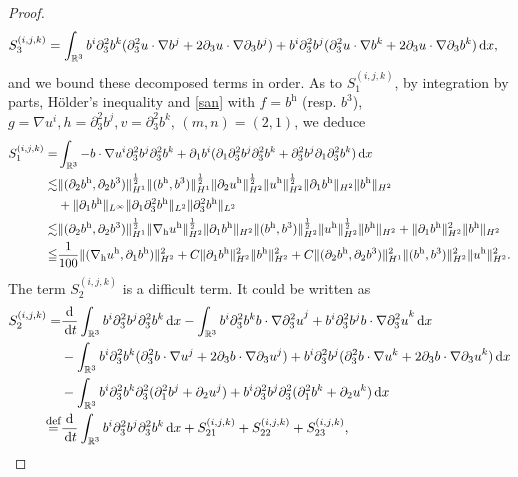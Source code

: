 \documentclass[11pt]{amsart}
\theoremstyle{definition}
\newcommand{\R}{\mathbb{R}}
\newcommand{\h}{\mathrm{h}}
\def\eqdefa{\buildrel\hbox{\footnotesize def}\over =}
\newcommand{\dx}{\,{\rm d}x}
\newcommand{\dt}{\,{\rm d}t}
\newcommand{\nablah}{\nabla_{\mathrm{h}}}
\numberwithin{equation}{section}
\begin{document}
\begin{proof}
\begin{align*}
		S^{(i,j,k)}_3&=\int_{\R^3} b^i\partial_3^2b^k(\partial_3^2u\cdot\nabla{b}^j+2\partial_3u\cdot\nabla\partial_3{b}^j)+b^i\partial_3^2b^j(\partial_3^2u\cdot\nabla{b}^k+2\partial_3u\cdot\nabla\partial_3{b}^k)\dx,
	\end{align*}
	and we bound these decomposed terms in order. As to $S^{(i,j,k)}_1$, by integration by parts, H\"older's inequality and \eqref{san} with $f=b^\h$ (resp. $b^3$), $g=\nabla{u}^i,h=\partial_3^2b^j,v=\partial_3^2b^k$, $(m,n)=(2,1)$, we deduce
	\begin{align}\label{S1}
		S^{(i,j,k)}_1=&\int_{\R^3}-b\cdot\nabla{u}^i\partial_3^2b^j\partial_3^2b^k+ \partial_1b^i(\partial_1\partial_3^2b^j\partial_3^2b^k+\partial_3^2b^j\partial_1\partial_3^2b^k) \dx\nonumber\\
		\lesssim&\|(\partial_2b^\h,\partial_2b^3)\|_{H^1}^\frac12\|(b^\h,b^3)\|_{H^1}^\frac12\|\partial_2u^\h\|_{H^2}^\frac12\|u^\h\|_{H^2}^\frac12\|\partial_1b^\h\|_{H^2}\|b^\h\|_{H^2}\nonumber\\
		&+\|\partial_1b^\h\|_{L^\infty}\|\partial_1\partial_3^2b^\h\|_{L^2}\|\partial_3^2b^\h\|_{L^2}\nonumber\\
		\lesssim&\|(\partial_2b^\h,\partial_2b^3)\|_{H^1}^\frac12\|\nablah u^\h\|_{H^2}^\frac12\|\partial_1b^\h\|_{H^2}\|(b^\h,b^3)\|_{H^2}^\frac12\|u^\h\|_{H^2}^\frac12\|b^\h\|_{H^2}+\|\partial_1b^\h\|_{H^2}^2\|b^\h\|_{H^2}\nonumber\\
		\leqq &\frac{1}{100}\|(\nablah u^\h,\partial_1b^\h)\|_{H^2}^2+C\|\partial_1b^\h\|_{H^2}^2\|b^\h\|_{H^2}^2+C\|(\partial_2b^\h,\partial_2b^3)\|_{H^1}^2\|(b^\h,b^3)\|_{H^2}^2\|u^\h\|_{H^2}^2.
	\end{align}
	The term $S^{(i,j,k)}_2$ is a difficult term. It could be written as
	\begin{align*}
		S^{(i,j,k)}_2=&\frac{\mathrm{d}}{\dt}\int_{\R^3} b^i\partial_3^2b^j\partial_3^2b^k\dx-\int_{\R^3} b^i\partial_3^2b^k b\cdot\nabla{\partial_3^2u}^j+b^i\partial_3^2b^jb\cdot\nabla{\partial_3^2u}^k\dx\\
		&-\int_{\R^3} b^i\partial_3^2b^k(\partial_3^2 b\cdot\nabla{u}^j+2\partial_3 b\cdot\nabla{\partial_3u}^j)+b^i\partial_3^2b^j(\partial_3^2b\cdot\nabla{u}^k+2\partial_3b\cdot\nabla{\partial_3u}^k)\dx\\
		&-\int_{\R^3} b^i\partial_3^2b^k\partial_3^2(\partial_1^2b^j +\partial_2u^j)+ b^i\partial_3^2b^j\partial_3^2(\partial_1^2b^k +\partial_2u^k)\dx\\
		\eqdefa&\frac{\mathrm{d}}{\dt}\int_{\R^3} b^i\partial_3^2b^j\partial_3^2b^k\dx+S^{(i,j,k)}_{21}+S^{(i,j,k)}_{22}+S^{(i,j,k)}_{23},

\end{align*}
\end{proof}
\end{document}
